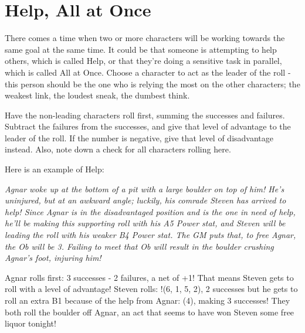 \documentclass[../main.tex]{subfiles}
\begin{document}
    \section{Help, All at Once}

        There comes a time when two or more characters will be working towards the same goal at the same time. It could be that someone is attempting to help others, which is called Help, or that they're doing a sensitive task in parallel, which is called All at Once. Choose a character to act as the leader of the roll - this person should be the one who is relying the most on the other characters; the weakest link, the loudest sneak, the dumbest think.

        Have the non-leading characters roll first, summing the successes and failures. Subtract the failures from the successes, and give that level of advantage to the leader of the roll. If the number is negative, give that level of disadvantage instead. Also, note down a check for all characters rolling here.

        Here is an example of Help:
        \vspace*{0.1cm}
        \begin{mdframed}[style=Arrata]
            {\em Agnar woke up at the bottom of a pit with a large boulder on top of him! He's uninjured, but at an awkward angle; luckily, his comrade Steven has arrived to help! Since Agnar is in the disadvantaged position and is the one in need of help, he'll be making this supporting roll with his A5 Power stat, and Steven will be leading the roll with his weaker B4 Power stat. The GM puts that, to free Agnar, the Ob will be 3. Failing to meet that Ob will result in the boulder crushing Agnar's foot, injuring him!

            Agnar rolls first: 3 successes - 2 failures, a net of +1! That means Steven gets to roll with a level of advantage! Steven rolls: !(6, 1, 5, 2), 2 successes but he gets to roll an extra B1 because of the help from Agnar: (4), making 3 successes! They both roll the boulder off Agnar, an act that seems to have won Steven some free liquor tonight!}
        \end{mdframed}
\end{document}
